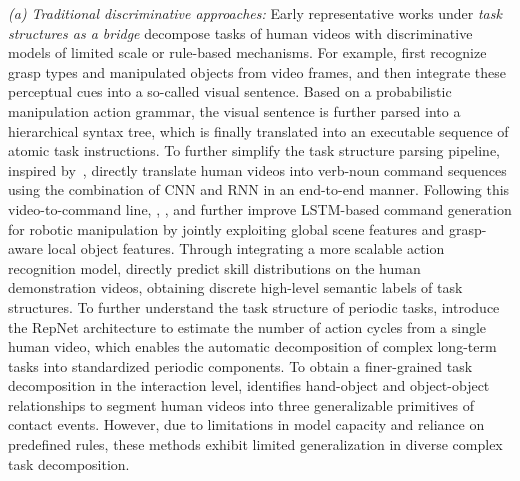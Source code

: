 \documentclass[Afour,sageh,times]{sagej}
\begin{document}
\textit{(a) Traditional discriminative approaches:} Early representative works under \textit{task structures as a bridge} decompose tasks of human videos with discriminative models of limited scale or rule-based mechanisms. For example, \cite{yang2015robot} first recognize grasp types and manipulated objects from video frames, and then integrate these perceptual cues into a so-called visual sentence. Based on a probabilistic manipulation action grammar, the visual sentence is further parsed into a hierarchical syntax tree, which is finally translated into an executable sequence of atomic task instructions. To further simplify the task structure parsing pipeline, inspired by~\cite{aksoy2017unsupervised}, \cite{nguyen2018translating} directly translate human videos into verb-noun command sequences using the combination of CNN and RNN in an end-to-end manner. Following this video-to-command line, \cite{yang2019learning}, \cite{yang2022explicit}, and \cite{yang2023watch} further improve LSTM-based command generation for robotic manipulation by jointly exploiting global scene features and grasp-aware local object features. Through integrating a more scalable action recognition model, \cite{pertsch2022cross} directly predict skill distributions on the human demonstration videos, obtaining discrete high-level semantic labels of task structures. To further understand the task structure of periodic tasks, \cite{yang2022learning} introduce the RepNet architecture to estimate the number of action cycles from a single human video, which enables the automatic decomposition of complex long-term tasks into standardized periodic components. To obtain a finer-grained task decomposition in the interaction level, \cite{guo2023learning} identifies hand-object and object-object relationships to segment human videos into three generalizable primitives of contact events. However, due to limitations in model capacity and reliance on predefined rules, these methods exhibit limited generalization in diverse complex task decomposition.
\end{document}
